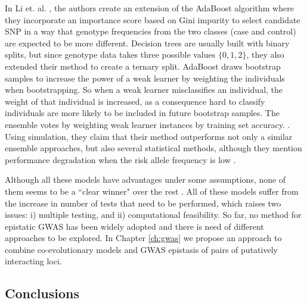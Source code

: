 \begin{enumerate}
In Li et. al. \cite{li2011detecting}, the authors create an extension of the AdaBoost algorithm where they incorporate an importance score based on Gini impurity to select candidate SNP  in a way that genotype frequencies from the two classes (case and control) are expected to be more different.
Decision trees are usually built with binary splits, but since genotype data takes three possible values $\{0, 1, 2\}$, they also extended their method to create a ternary split.
AdaBoost draws bootstrap samples to increase the power of a weak learner by weighting the individuals when bootstrapping. 
So when a weak learner misclassifies an individual, the weight of that individual is increased, as a consequence hard to classify individuals are more likely to be included in future bootstrap samples. 
The ensemble votes by weighting weak learner instances by training set accuracy.  \cite{li2011detecting}.
Using simulation, they claim that their method outperforms not only a similar ensemble approaches, but also several statistical methods, although they mention performance degradation when the risk allele frequency is low \cite{li2011detecting}.

\end{enumerate}

Although all these models have advantages under some assumptions, none of them seems to be a ``clear winner" over the rest \cite{cordell2009detecting}. 
All of these models suffer from the increase in number of tests that need to be performed, which raises two issues: 
i) multiple testing, and 
ii) computational feasibility.
So far, no method for epistatic GWAS has been widely adopted and there is need of different approaches to be explored. In Chapter \ref{ch:gwas} we propose an approach to combine co-evolutionary models and GWAS epistasis of pairs of putatively interacting loci.

\subsection{Conclusions \label{sec:epigwas}}

